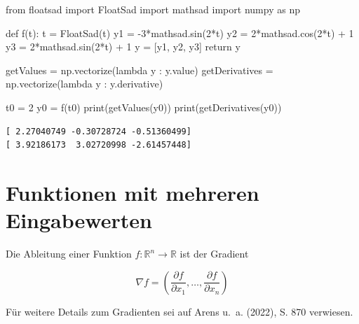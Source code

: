 \documentclass[
  a4paper,
  DIV=11]{scrreprt}
\newenvironment{Shaded}{\begin{snugshade}}{\end{snugshade}}
\newcommand{\BuiltInTok}[1]{\textcolor[rgb]{0.00,0.23,0.31}{#1}}
\newcommand{\ControlFlowTok}[1]{\textcolor[rgb]{0.00,0.23,0.31}{#1}}
\newcommand{\DecValTok}[1]{\textcolor[rgb]{0.68,0.00,0.00}{#1}}
\newcommand{\ImportTok}[1]{\textcolor[rgb]{0.00,0.46,0.62}{#1}}
\newcommand{\KeywordTok}[1]{\textcolor[rgb]{0.00,0.23,0.31}{#1}}
\newcommand{\NormalTok}[1]{\textcolor[rgb]{0.00,0.23,0.31}{#1}}
\newcommand{\OperatorTok}[1]{\textcolor[rgb]{0.37,0.37,0.37}{#1}}
\theoremstyle{definition}
\theoremstyle{definition}
\theoremstyle{remark}
\begin{document}
\begin{Shaded}
\begin{Highlighting}[]
\ImportTok{from}\NormalTok{ floatsad }\ImportTok{import}\NormalTok{ FloatSad}
\ImportTok{import}\NormalTok{ mathsad}
\ImportTok{import}\NormalTok{ numpy }\ImportTok{as}\NormalTok{ np}

\KeywordTok{def}\NormalTok{ f(t):}
\NormalTok{    t }\OperatorTok{=}\NormalTok{ FloatSad(t)}
\NormalTok{    y1 }\OperatorTok{=} \OperatorTok{{-}}\DecValTok{3}\OperatorTok{*}\NormalTok{mathsad.sin(}\DecValTok{2}\OperatorTok{*}\NormalTok{t)}
\NormalTok{    y2 }\OperatorTok{=}  \DecValTok{2}\OperatorTok{*}\NormalTok{mathsad.cos(}\DecValTok{2}\OperatorTok{*}\NormalTok{t) }\OperatorTok{+} \DecValTok{1}
\NormalTok{    y3 }\OperatorTok{=}  \DecValTok{2}\OperatorTok{*}\NormalTok{mathsad.sin(}\DecValTok{2}\OperatorTok{*}\NormalTok{t) }\OperatorTok{+} \DecValTok{1}
\NormalTok{    y }\OperatorTok{=}\NormalTok{ [y1, y2, y3]}
    \ControlFlowTok{return}\NormalTok{ y}

\NormalTok{getValues }\OperatorTok{=}\NormalTok{ np.vectorize(}\KeywordTok{lambda}\NormalTok{ y : y.value)}
\NormalTok{getDerivatives }\OperatorTok{=}\NormalTok{ np.vectorize(}\KeywordTok{lambda}\NormalTok{ y : y.derivative)}

\NormalTok{t0 }\OperatorTok{=} \DecValTok{2}
\NormalTok{y0 }\OperatorTok{=}\NormalTok{ f(t0)}
\BuiltInTok{print}\NormalTok{(getValues(y0))}
\BuiltInTok{print}\NormalTok{(getDerivatives(y0))}
\end{Highlighting}
\end{Shaded}

\begin{verbatim}
[ 2.27040749 -0.30728724 -0.51360499]
[ 3.92186173  3.02720998 -2.61457448]
\end{verbatim}

\hypertarget{sec-FunktionenMehrereInputs}{%
\section{Funktionen mit mehreren
Eingabewerten}\label{sec-FunktionenMehrereInputs}}

Die Ableitung einer Funktion \(f : \mathbb{R}^n \rightarrow \mathbb{R}\)
ist der Gradient

\[
\nabla f = \left( \frac{\partial f}{\partial x_1}, \ldots, \frac{\partial f}{\partial x_n} \right)
\]

Für weitere Details zum Gradienten sei auf Arens u.~a. (2022), S. 870
verwiesen.
\end{document}
